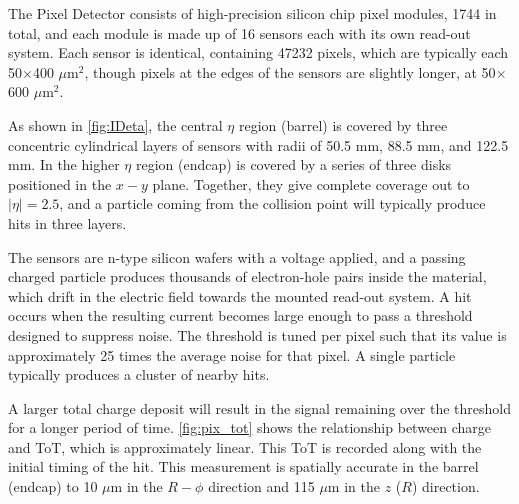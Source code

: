 The Pixel Detector consists of high-precision silicon chip pixel modules, 1744 in total, and each module is made up of 16 sensors each with its own read-out system. Each sensor is identical, containing 47232 pixels, which are typically each 50$\times$400 $\mu$m$^2$, though pixels at the edges of the sensors are slightly longer, at 50$\times$600 $\mu$m$^2$.  

As shown in \autoref{fig:IDeta}, the central $\eta$ region (barrel) is covered by three concentric cylindrical layers of sensors with radii of 50.5 mm, 88.5 mm, and 122.5 mm. In the higher $\eta$ region (endcap) is covered by a series of three disks positioned in the $x-y$ plane. Together, they give complete coverage out to $|\eta| = 2.5$, and a particle coming from the collision point will typically produce hits in three layers. 

The sensors are n-type silicon wafers with a voltage applied, and a passing charged particle produces thousands of electron-hole pairs inside the material, which drift in the electric field towards the mounted read-out system. A hit occurs when the resulting current becomes large enough to pass a threshold designed to suppress noise. %
The threshold is tuned per pixel such that its value is approximately 25 times the average noise for that pixel. A single particle typically produces a cluster of nearby hits. 


A larger total charge deposit will result in the signal remaining over the threshold for a longer period of time. \autoref{fig:pix_tot} shows the relationship between charge and \ac{ToT}, which is approximately linear. This \ac{ToT} is recorded along with the initial timing of the hit. This measurement is spatially accurate in the barrel (endcap) to 10 $\mu$m in the $R-\phi$ direction and 115 $\mu$m in the $z$ ($R$) direction. 

